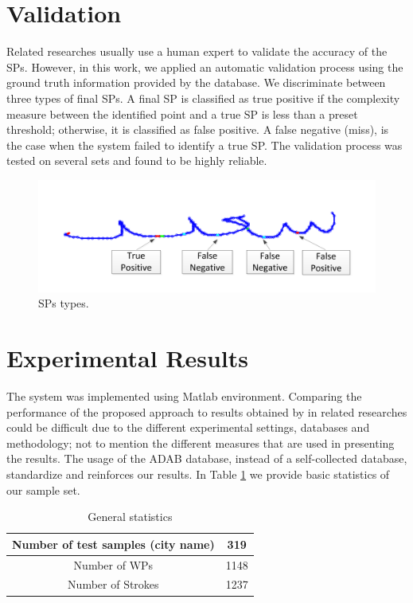 \documentclass[10pt, conference, compsocconf]{IEEEtran}
\begin{document}
\section{Validation}
\label{sec:validation}
Related researches usually use a human expert to validate the accuracy of the SPs. However, in this work, we applied an automatic validation process using the ground truth information provided by the database. We discriminate between three types of final SPs. A final SP is classified as true positive if the complexity measure between the identified point and a true SP is less than a preset threshold; otherwise, it is classified as false positive. A false negative (miss), is the case when the system failed to identify a true SP. The validation process was tested on several sets and found to be highly reliable.

\begin{figure}
\centering
\includegraphics[width=0.8\columnwidth]{./figures/sp_types}
\caption{SPs types.}
\label{fig:sp_types}
\end{figure}

\section{Experimental Results}
\label{sec:results}
The system was implemented using Matlab environment. Comparing the performance of the proposed approach to results obtained by in related researches could be difficult due to the different experimental settings, databases and methodology; not to mention the different measures that are used in presenting the results. The usage of the ADAB database, instead of a self-collected database, standardize and reinforces our results. In Table \ref{table:general_stats} we provide basic statistics of our sample set.\\

\begin{table}[h]
\caption{General statistics}
\renewcommand{\arraystretch}{1.2}
\begin{tabular}{ | c | c | }
  \hline
  Number of test samples (city name) & 319 \\
  \hline
  Number of WPs & 1148 \\
  \hline
  Number of Strokes & 1237 \\
  \hline
\end{tabular}
\centering
\label{table:general_stats} 
\end{table}
\end{document}
